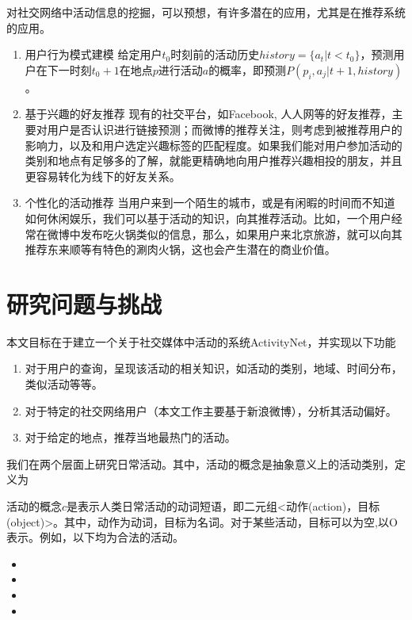 对社交网络中活动信息的挖掘，可以预想，有许多潜在的应用，尤其是在推荐系统的应用。
\begin{enumerate}
\item{\heiti 用户行为模式建模} 给定用户$t_0$时刻前的活动历史$history = \{a_t|t<t_0\}$，预测用户在下一时刻$t_0+1$在地点$p$进行活动$a$的概率，即预测$P(p_i, a_j|t+1,history)$。
\item{\heiti 基于兴趣的好友推荐} 现有的社交平台，如Facebook, 人人网等的好友推荐，主要对用户是否认识进行链接预测；而微博的推荐关注，则考虑到被推荐用户的影响力，以及和用户选定兴趣标签的匹配程度。如果我们能对用户参加活动的类别和地点有足够多的了解，就能更精确地向用户推荐兴趣相投的朋友，并且更容易转化为线下的好友关系。
\item{\heiti 个性化的活动推荐} 当用户来到一个陌生的城市，或是有闲暇的时间而不知道如何休闲娱乐，我们可以基于活动的知识，向其推荐活动。比如，一个用户经常在微博中发布吃火锅类似的信息，那么，如果用户来北京旅游，就可以向其推荐东来顺等有特色的涮肉火锅，这也会产生潜在的商业价值。
\end{enumerate}

\section{研究问题与挑战}

本文目标在于建立一个关于社交媒体中活动的系统ActivityNet，并实现以下功能

\begin{enumerate}
\item 对于用户的查询，呈现该活动的相关知识，如活动的类别，地域、时间分布，类似活动等等。
\item 对于特定的社交网络用户（本文工作主要基于新浪微博），分析其活动偏好。
\item 对于给定的地点，推荐当地最热门的活动。
\end{enumerate}

我们在两个层面上研究日常活动。其中，活动的概念是抽象意义上的活动类别，定义为
\begin{definition}
活动的概念$c$是表示人类日常活动的动词短语，即二元组<动作(action)，目标(object)>。其中，动作为动词，目标为名词。对于某些活动，目标可以为空,以O表示。例如，以下均为合法的活动。
\begin{itemize}
\item <吃,烤鸭>
\item <参加,会议>
\item <游泳,O>
\item <旅游,O>
\end{itemize}
\label{def:concept}
\end{definition}

